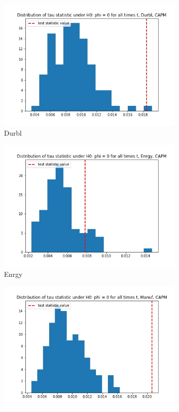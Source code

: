 \documentclass{article}
\begin{document}
\begin{figure}
\begin{subfigure}[b]{0.5\textwidth}
    \includegraphics[width=\textwidth]{Durbl/tau_hist_02_CAPM.jpg}
    \caption{Durbl}
    \label{fig:2}
  \end{subfigure}
  \begin{subfigure}[b]{0.5\textwidth}
    \centering
    \includegraphics[width=\textwidth]{Enrgy/tau_hist_02_CAPM.jpg}
    \caption{Enrgy}
    \label{fig:2}
  \end{subfigure}
  \begin{subfigure}[b]{0.5\textwidth}
    \centering
    \includegraphics[width=\textwidth]{Manuf/tau_hist_02_CAPM.jpg}

\end{subfigure}
\end{figure}
\end{document}
